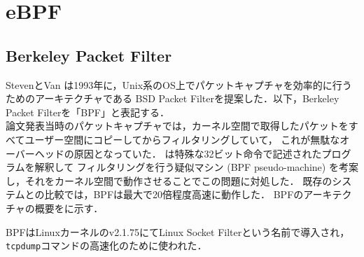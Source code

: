 \section{eBPF}
  \subsection{Berkeley Packet Filter}
    StevenとVan \cite{mccanne1993bsd}は1993年に，Unix系のOS上でパケットキャプチャを効率的に行うためのアーキテクチャである
    BSD Packet Filterを提案した．以下，Berkeley Packet Filterを「BPF」と表記する． \\
    論文発表当時のパケットキャプチャでは，カーネル空間で取得したパケットをすべてユーザー空間にコピーしてからフィルタリングしていて，
    これが無駄なオーバーヘッドの原因となっていた．
    \cite{mccanne1993bsd}は特殊な32ビット命令で記述されたプログラムを解釈して
    フィルタリングを行う疑似マシン (BPF pseudo-machine) を考案し，それをカーネル空間で動作させることでこの問題に対処した．
    既存のシステムとの比較では，BPFは最大で20倍程度高速に動作した．
    BPFのアーキテクチャの概要をに示す．
    
    BPFはLinuxカーネルのv2.1.75にてLinux Socket Filterという名前で導入され，\texttt{tcpdump}コマンドの高速化のために使われた．
    

